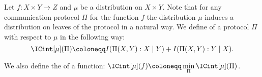 






\begin{definition*}
    Let $f\colon X \times Y \to Z$ and $\mu$ be a distribution on $X \times Y$. Note that for any
    communication protocol $\Pi$ for the function $f$ the distribution $\mu$ induces a distribution on
    leaves of the protocol in a natural way. We define  of a protocol
    $\Pi$ with respect to $\mu$ in the following way:
    $$\ICint[\mu](\Pi) \coloneqq I(\Pi(X, Y) : X \mid Y) + I(\Pi(X, Y) : Y \mid X).$$
    
    We also define the  of a function:
    $\ICint[\mu](f) \coloneqq \min\limits_{\Pi} \ICint[\mu](\Pi)$.
\end{definition*}










